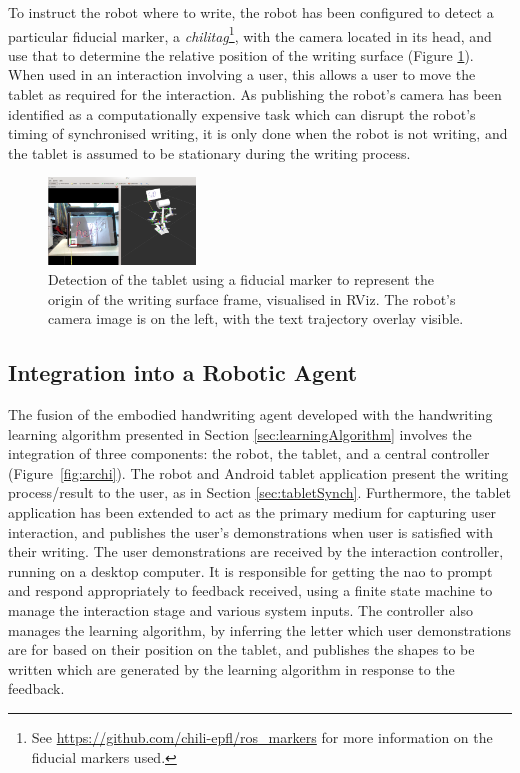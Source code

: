 \documentclass{sig-alternate}
\begin{document}
To instruct the robot where to write, the robot has been configured to detect a
particular fiducial marker, a \emph{chilitag}\footnote{See
\url{https://github.com/chili-epfl/ros_markers} for more information on the
fiducial markers used.}, with the camera located in its head, and use that to
determine the relative position of the writing surface (Figure
\ref{fig:tabletDetection}). When used in an interaction involving a user, this
allows a user to move the tablet as required for the interaction. As publishing
the robot's camera has been identified as a computationally expensive task which
can disrupt the robot's timing of synchronised writing, it is only done when the
robot is not writing, and the tablet is assumed to be stationary during the
writing process.

\begin{figure}[htpb]
    \centering
    \includegraphics[width=0.35\textwidth]{figures/chilitagDetection_cameraOverlay.png}
    \caption{\label{fig:tabletDetection}Detection of the tablet using a fiducial
    marker to represent the origin of the writing surface frame, visualised in RViz. The robot's
    camera image is on the left, with the text trajectory overlay visible.}

\end{figure}


\subsection{Integration into a Robotic Agent}

The fusion of the embodied handwriting agent developed with the handwriting
learning algorithm presented in Section \ref{sec:learningAlgorithm} involves the
integration of three components: the robot, the tablet, and a central controller
(Figure~\ref{fig:archi}).  The robot and Android tablet application present the
writing process/result to the user, as in Section \ref{sec:tabletSynch}.
Furthermore, the tablet application has been extended to act as the primary medium for
capturing user interaction, and publishes the user's demonstrations when user is
satisfied with their writing. The user demonstrations are received by the
interaction controller, running on a desktop computer. It is responsible for
getting the {\sc nao} to prompt and respond appropriately to feedback received, using
a finite state machine to manage the interaction stage and various system
inputs. The controller also manages the learning algorithm, by inferring the letter which
user demonstrations are for based on their position on the tablet, and
publishes the shapes to be written which are generated by the learning algorithm
in response to the feedback.  
\end{document}
